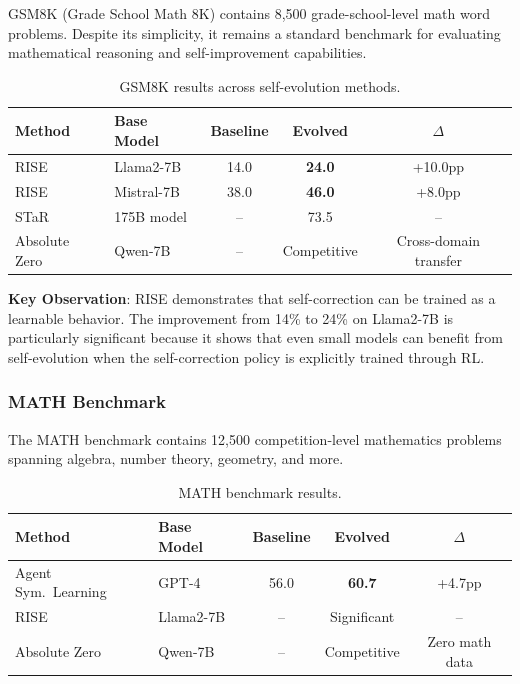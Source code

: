 GSM8K (Grade School Math 8K) contains 8,500 grade-school-level math word problems. Despite its simplicity, it remains a standard benchmark for evaluating mathematical reasoning and self-improvement capabilities.

\begin{table}[htbp]
\centering
\caption{GSM8K results across self-evolution methods.}
\label{tab:gsm8k-results}
\begin{tabular}{llccc}
\toprule
\textbf{Method} & \textbf{Base Model} & \textbf{Baseline} & \textbf{Evolved} & \textbf{$\Delta$} \\
\midrule
RISE & Llama2-7B & 14.0 & \textbf{24.0} & +10.0pp \\
RISE & Mistral-7B & 38.0 & \textbf{46.0} & +8.0pp \\
STaR & 175B model & -- & 73.5 & -- \\
Absolute Zero & Qwen-7B & -- & Competitive & Cross-domain transfer \\
\bottomrule
\end{tabular}
\end{table}

\textbf{Key Observation}: RISE demonstrates that self-correction can be trained as a learnable behavior. The improvement from 14\% to 24\% on Llama2-7B is particularly significant because it shows that even small models can benefit from self-evolution when the self-correction policy is explicitly trained through RL.

\subsubsection{MATH Benchmark}

The MATH benchmark contains 12,500 competition-level mathematics problems spanning algebra, number theory, geometry, and more.

\begin{table}[htbp]
\centering
\caption{MATH benchmark results.}
\label{tab:math-results}
\begin{tabular}{llccc}
\toprule
\textbf{Method} & \textbf{Base Model} & \textbf{Baseline} & \textbf{Evolved} & \textbf{$\Delta$} \\
\midrule
Agent Sym.\ Learning & GPT-4 & 56.0 & \textbf{60.7} & +4.7pp \\
RISE & Llama2-7B & -- & Significant & -- \\
Absolute Zero & Qwen-7B & -- & Competitive & Zero math data \\
\bottomrule
\end{tabular}
\end{table}

